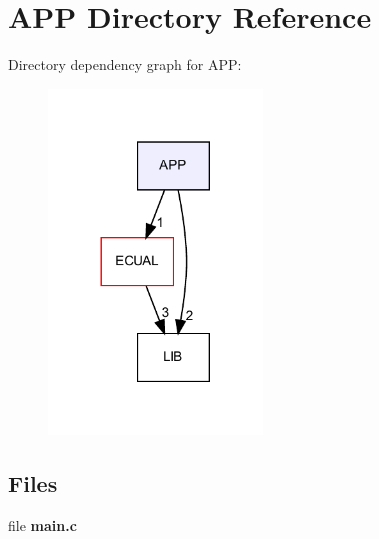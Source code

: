 \section{A\+PP Directory Reference}
\label{dir_0ca16891106f5a3e9ad635a0d6c5f98f}
Directory dependency graph for A\+PP\+:\nopagebreak
\begin{figure}[H]
\begin{center}
\leavevmode
\includegraphics[width=161pt]{dir_0ca16891106f5a3e9ad635a0d6c5f98f_dep}
\end{center}
\end{figure}
\subsection*{Files}
\begin{DoxyCompactItemize}
\item 
file \textbf{ main.\+c}
\end{DoxyCompactItemize}

